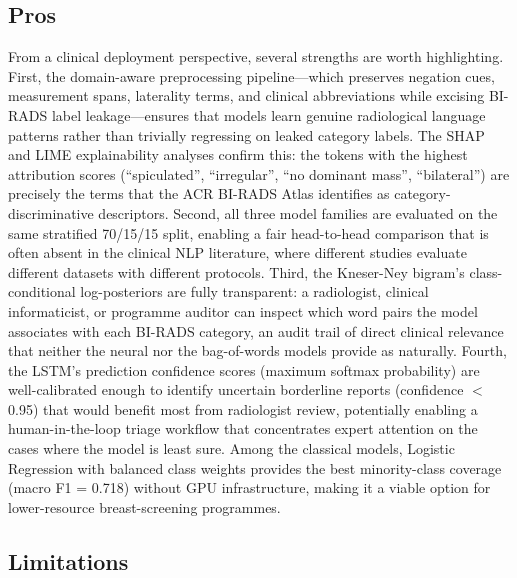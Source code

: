 \documentclass[11pt,a4paper]{article}
\begin{document}
\subsection{Pros}
\label{sec:strengths}

From a clinical deployment perspective, several strengths are worth
highlighting.
First, the domain-aware preprocessing pipeline---which preserves negation
cues, measurement spans, laterality terms, and clinical abbreviations while
excising BI-RADS label leakage---ensures that models learn genuine radiological
language patterns rather than trivially regressing on leaked category labels.
The SHAP and LIME explainability analyses confirm this: the tokens with the
highest attribution scores (``spiculated'', ``irregular'', ``no dominant mass'',
``bilateral'') are precisely the terms that the ACR BI-RADS Atlas identifies
as category-discriminative descriptors.
Second, all three model families are evaluated on the same stratified
70/15/15 split, enabling a fair head-to-head comparison that is often absent
in the clinical NLP literature, where different studies evaluate different
datasets with different protocols.
Third, the Kneser-Ney bigram's class-conditional log-posteriors are fully
transparent: a radiologist, clinical informaticist, or programme auditor can
inspect which word pairs the model associates with each BI-RADS category,
an audit trail of direct clinical relevance that neither the neural nor the
bag-of-words models provide as naturally.
Fourth, the LSTM's prediction confidence scores (maximum softmax probability)
are well-calibrated enough to identify uncertain borderline reports
(confidence $<$ 0.95) that would benefit most from radiologist review,
potentially enabling a human-in-the-loop triage workflow that concentrates
expert attention on the cases where the model is least sure.
Among the classical models, Logistic Regression with balanced class weights
provides the best minority-class coverage (macro F1 = 0.718) without GPU
infrastructure, making it a viable option for lower-resource breast-screening
programmes.

\subsection{Limitations}
\end{document}
